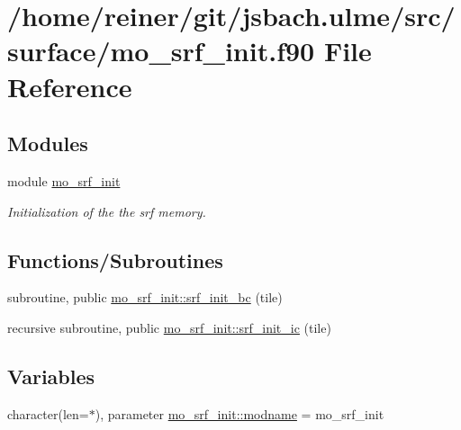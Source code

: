 \hypertarget{mo__srf__init_8f90}{}\section{/home/reiner/git/jsbach.ulme/src/surface/mo\+\_\+srf\+\_\+init.f90 File Reference}
\label{mo__srf__init_8f90}
\subsection*{Modules}
\begin{DoxyCompactItemize}
\item 
module \hyperlink{namespacemo__srf__init}{mo\+\_\+srf\+\_\+init}
\begin{DoxyCompactList}\small\item\em Initialization of the the srf memory. \end{DoxyCompactList}\end{DoxyCompactItemize}
\subsection*{Functions/\+Subroutines}
\begin{DoxyCompactItemize}
\item 
subroutine, public \hyperlink{namespacemo__srf__init_a7c44e1a5211e8f4702bfd3724031f8d7}{mo\+\_\+srf\+\_\+init\+::srf\+\_\+init\+\_\+bc} (tile)
\item 
recursive subroutine, public \hyperlink{namespacemo__srf__init_a7991eb826bda9d166a7e59489d44ea9b}{mo\+\_\+srf\+\_\+init\+::srf\+\_\+init\+\_\+ic} (tile)
\end{DoxyCompactItemize}
\subsection*{Variables}
\begin{DoxyCompactItemize}
\item 
character(len=$\ast$), parameter \hyperlink{namespacemo__srf__init_aa48301154b912ae072ff1916d431321b}{mo\+\_\+srf\+\_\+init\+::modname} = \textquotesingle{}mo\+\_\+srf\+\_\+init\textquotesingle{}
\end{DoxyCompactItemize}
